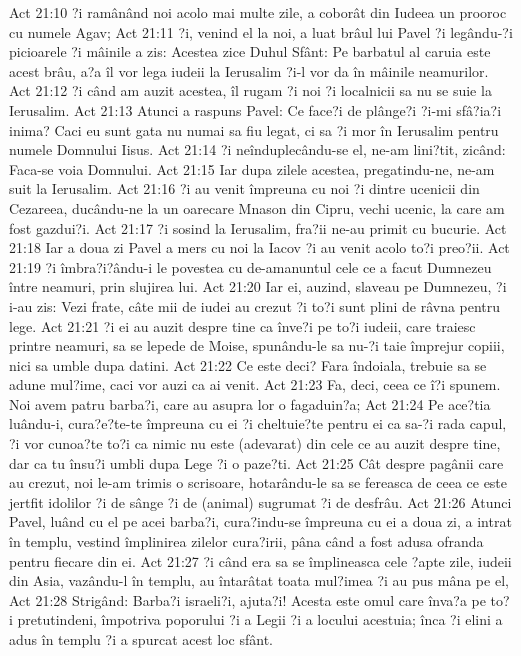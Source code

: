 Act 21:10  ?i ramânând noi acolo mai multe zile, a coborât din Iudeea un prooroc cu numele Agav;
Act 21:11  ?i, venind el la noi, a luat brâul lui Pavel ?i legându-?i picioarele ?i mâinile a zis: Acestea zice Duhul Sfânt: Pe barbatul al caruia este acest brâu, a?a îl vor lega iudeii la Ierusalim ?i-l vor da în mâinile neamurilor.
Act 21:12  ?i când am auzit acestea, îl rugam ?i noi ?i localnicii sa nu se suie la Ierusalim.
Act 21:13  Atunci a raspuns Pavel: Ce face?i de plânge?i ?i-mi sfâ?ia?i inima? Caci eu sunt gata nu numai sa fiu legat, ci sa ?i mor în Ierusalim pentru numele Domnului Iisus.
Act 21:14  ?i neînduplecându-se el, ne-am lini?tit, zicând: Faca-se voia Domnului.
Act 21:15  Iar dupa zilele acestea, pregatindu-ne, ne-am suit la Ierusalim.
Act 21:16  ?i au venit împreuna cu noi ?i dintre ucenicii din Cezareea, ducându-ne la un oarecare Mnason din Cipru, vechi ucenic, la care am fost gazdui?i.
Act 21:17  ?i sosind la Ierusalim, fra?ii ne-au primit cu bucurie.
Act 21:18  Iar a doua zi Pavel a mers cu noi la Iacov ?i au venit acolo to?i preo?ii.
Act 21:19  ?i îmbra?i?ându-i le povestea cu de-amanuntul cele ce a facut Dumnezeu între neamuri, prin slujirea lui.
Act 21:20  Iar ei, auzind, slaveau pe Dumnezeu, ?i i-au zis: Vezi frate, câte mii de iudei au crezut ?i to?i sunt plini de râvna pentru lege.
Act 21:21  ?i ei au auzit despre tine ca înve?i pe to?i iudeii, care traiesc printre neamuri, sa se lepede de Moise, spunându-le sa nu-?i taie împrejur copiii, nici sa umble dupa datini.
Act 21:22  Ce este deci? Fara îndoiala, trebuie sa se adune mul?ime, caci vor auzi ca ai venit.
Act 21:23  Fa, deci, ceea ce î?i spunem. Noi avem patru barba?i, care au asupra lor o fagaduin?a;
Act 21:24  Pe ace?tia luându-i, cura?e?te-te împreuna cu ei ?i cheltuie?te pentru ei ca sa-?i rada capul, ?i vor cunoa?te to?i ca nimic nu este (adevarat) din cele ce au auzit despre tine, dar ca tu însu?i umbli dupa Lege ?i o paze?ti.
Act 21:25  Cât despre pagânii care au crezut, noi le-am trimis o scrisoare, hotarându-le sa se fereasca de ceea ce este jertfit idolilor ?i de sânge ?i de (animal) sugrumat ?i de desfrâu.
Act 21:26  Atunci Pavel, luând cu el pe acei barba?i, cura?indu-se împreuna cu ei a doua zi, a intrat în templu, vestind împlinirea zilelor cura?irii, pâna când a fost adusa ofranda pentru fiecare din ei.
Act 21:27  ?i când era sa se împlineasca cele ?apte zile, iudeii din Asia, vazându-l în templu, au întarâtat toata mul?imea ?i au pus mâna pe el,
Act 21:28  Strigând: Barba?i israeli?i, ajuta?i! Acesta este omul care înva?a pe to?i pretutindeni, împotriva poporului ?i a Legii ?i a locului acestuia; înca ?i elini a adus în templu ?i a spurcat acest loc sfânt.

